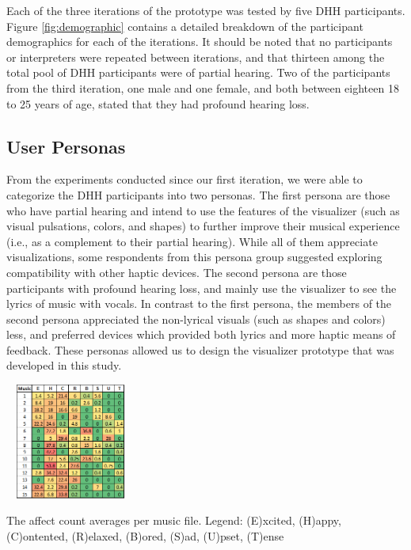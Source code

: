 \documentclass{sigchi-ext}
\begin{document}
Each of the three iterations of the prototype was tested by five DHH participants. Figure \ref{fig:demographic} contains a detailed breakdown of the participant demographics for each of the iterations. It should be noted that no participants or interpreters were repeated between iterations, and that thirteen among the total pool of DHH participants were of partial hearing. Two of the participants from the third iteration, one male and one female, and both between eighteen 18 to 25 years of age, stated that they had profound hearing loss.

\subsection{User Personas}
From the experiments conducted since our first iteration, we were able to categorize the DHH participants into two personas. The first persona are those who have partial hearing and intend to use the features of the visualizer (such as visual pulsations, colors, and shapes) to further improve their musical experience (i.e., as a complement to their partial hearing). While all of them appreciate visualizations, some respondents from this persona group suggested exploring compatibility with other haptic devices. The second persona are those participants with profound hearing loss, and mainly use the visualizer to see the lyrics of music with vocals. In contrast to the first persona, the members of the second persona appreciated the non-lyrical visuals (such as shapes and colors) less, and preferred devices which provided both lyrics and more haptic means of feedback. These personas allowed us to design the visualizer prototype that was developed in this study.


\begin{marginfigure}[-28pc]
\begin{minipage}{\marginparwidth}
     \includegraphics[width=4.3cm,height=3.8cm]{figures/Affects.png}
    \caption{The affect count averages per music file. Legend: (E)xcited, (H)appy, (C)ontented, (R)elaxed, (B)ored, (S)ad, (U)pset, (T)ense}
    \label{fig:affects}
    \end{minipage}
\end{marginfigure}
\end{document}

